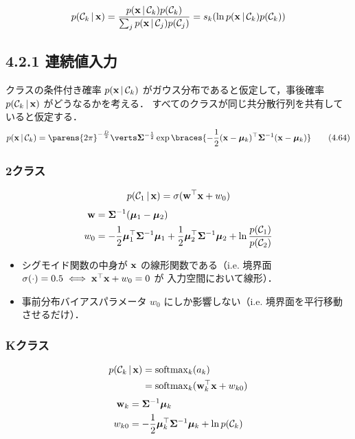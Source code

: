 \begin{equation}
  p({\mathcal{C}}_k \,|\, {\mathbf{x}}) = \frac{p({\mathbf{x}}\,|\,{\mathcal{C}}_{k})p({\mathcal{C}}_{k})}{\sum_j p({\mathbf{x}}\,|\,{\mathcal{C}}_{j})p({\mathcal{C}}_{j})} = s_k(\ln p({\mathbf{x}}\,|\,{\mathcal{C}}_{k})p({\mathcal{C}}_{k}))
\end{equation}


\subsection*{4.2.1 連続値入力}

クラスの条件付き確率 $p({\mathbf{x}} \,|\, {\mathcal{C}}_k)$ がガウス分布であると仮定して，事後確率 $p({\mathcal{C}}_k \,|\, {\mathbf{x}})$ がどうなるかを考える．
すべてのクラスが同じ共分散行列を共有していると仮定する．
\[
p(\vx \given \cC_k) = \parens{2\pi}^{-\frac{D}{2}} \abs{\mSigma}^{-\frac{1}{2}} \exp \braces{-\frac{1}{2} (\vx - \vmu_k)^\top \mSigma^{-1} (\vx - \vmu_k) } \tag{4.64}
\]

\subsubsection*{2クラス}

\begin{equation}
  p({\mathcal{C}}_1 \,|\, {\mathbf{x}}) = \sigma({\mathbf{w}}^\top {\mathbf{x}} + w_0)
\end{equation}
\begin{align}
  {\mathbf{w}} & = \boldsymbol{\Sigma}^{-1} (\boldsymbol{\mu}_1 - \boldsymbol{\mu}_2) \\
  w_0 & = -\frac{1}{2} \boldsymbol{\mu}_1^\top \boldsymbol{\Sigma}^{-1} \boldsymbol{\mu}_1 + \frac{1}{2} \boldsymbol{\mu}_2^\top \boldsymbol{\Sigma}^{-1} \boldsymbol{\mu}_2 + \ln \frac{p({\mathcal{C}}_1)}{p({\mathcal{C}}_2)}
\end{align}

\begin{itemize}
  \item シグモイド関数の中身が ${\mathbf{x}}$ の線形関数である（i.e. 境界面 $\sigma(\cdot) = 0.5 \iff {\mathbf{x}}^\top {\mathbf{x}} + w_0 = 0$ が 入力空間において線形）．
  \item 事前分布バイアスパラメータ $w_0$ にしか影響しない（i.e. 境界面を平行移動させるだけ）．
\end{itemize}

\subsubsection*{Kクラス}

\begin{align}
  p({\mathcal{C}}_k \,|\, {\mathbf{x}}) & = \mathrm{softmax}_k(a_k) \notag \\
  & =  \mathrm{softmax}_k( {\mathbf{w}}_k^\top {\mathbf{x}} + w_{k0} )
\end{align}
\begin{align}
  {\mathbf{w}}_k & = \boldsymbol{\Sigma}^{-1} \boldsymbol{\mu}_k \\
  w_{k0} & = -\frac{1}{2} \boldsymbol{\mu}_k^\top \boldsymbol{\Sigma}^{-1} \boldsymbol{\mu}_k + \ln p({\mathcal{C}}_k)
\end{align}

